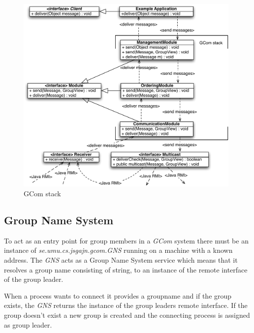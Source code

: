 \documentclass[titlepage, twocolumn, a4paper, 10pt]{article}
\begin{document}

\begin{figure}[!thb]
  \centerline{\includegraphics[width=110mm]{images/Stack.pdf}}
  \caption{GCom stack}
  \label{fig:images/Stack}
\end{figure}

\subsection{Group Name System}\label{sec:group-name-system}
To act as an entry point for group members in a \textit{GCom} system
there must be an instance of \textit{se.umu.cs.jsgajn.gcom.GNS}
running on a machine with a known address. The \textit{GNS} acts as a
Group Name System service which means that it resolves a group name
consisting of string, to an instance of the remote interface of the
group leader.

When a process wants to connect it provides a groupname and if
the group exists, the \textit{GNS} returns the instance of the group
leaders remote interface. If the group doesn't exist a new group is
created and the connecting process is assigned as group leader.
\end{document}
